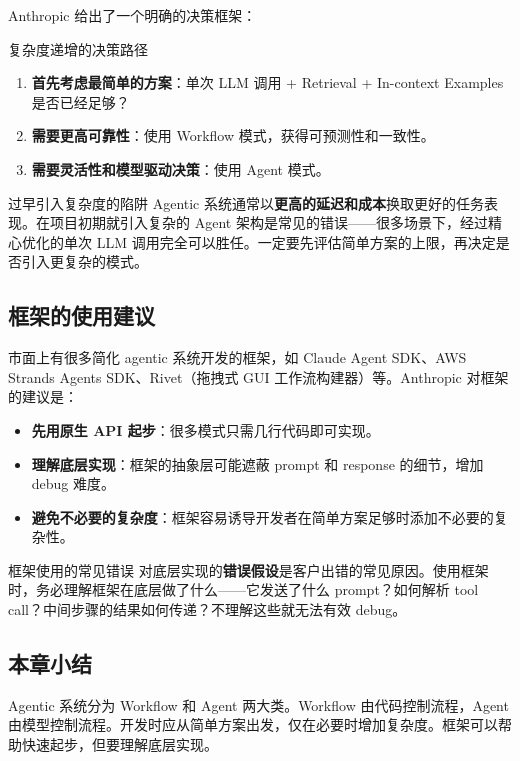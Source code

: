 \documentclass[a4paper]{article}
\begin{document}
Anthropic 给出了一个明确的决策框架：

\begin{knowledgebox}{复杂度递增的决策路径}
\begin{enumerate}
    \item \textbf{首先考虑最简单的方案}：单次 LLM 调用 + Retrieval + In-context Examples 是否已经足够？
    \item \textbf{需要更高可靠性}：使用 Workflow 模式，获得可预测性和一致性。
    \item \textbf{需要灵活性和模型驱动决策}：使用 Agent 模式。
\end{enumerate}
\end{knowledgebox}

\begin{warningbox}{过早引入复杂度的陷阱}
Agentic 系统通常以\textbf{更高的延迟和成本}换取更好的任务表现。在项目初期就引入复杂的 Agent 架构是常见的错误——很多场景下，经过精心优化的单次 LLM 调用完全可以胜任。一定要先评估简单方案的上限，再决定是否引入更复杂的模式。
\end{warningbox}

\subsection{框架的使用建议}

市面上有很多简化 agentic 系统开发的框架，如 Claude Agent SDK、AWS Strands Agents SDK、Rivet（拖拽式 GUI 工作流构建器）等。Anthropic 对框架的建议是：

\begin{itemize}
    \item \textbf{先用原生 API 起步}：很多模式只需几行代码即可实现。
    \item \textbf{理解底层实现}：框架的抽象层可能遮蔽 prompt 和 response 的细节，增加 debug 难度。
    \item \textbf{避免不必要的复杂度}：框架容易诱导开发者在简单方案足够时添加不必要的复杂性。
\end{itemize}

\begin{warningbox}{框架使用的常见错误}
对底层实现的\textbf{错误假设}是客户出错的常见原因。使用框架时，务必理解框架在底层做了什么——它发送了什么 prompt？如何解析 tool call？中间步骤的结果如何传递？不理解这些就无法有效 debug。
\end{warningbox}

\subsection{本章小结}
Agentic 系统分为 Workflow 和 Agent 两大类。Workflow 由代码控制流程，Agent 由模型控制流程。开发时应从简单方案出发，仅在必要时增加复杂度。框架可以帮助快速起步，但要理解底层实现。
\end{document}

